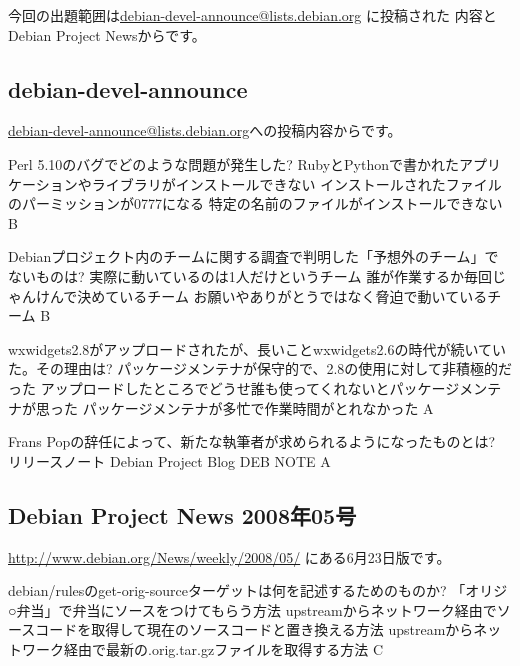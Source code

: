\documentclass[mingoth,a4paper]{jsarticle}
\begin{document}
今回の出題範囲は\url{debian-devel-announce@lists.debian.org} に投稿された
内容とDebian Project Newsからです。
\begin{multicols}{2}
 \subsection{debian-devel-announce}
 \url{debian-devel-announce@lists.debian.org}への投稿内容からです。
 
 \santaku
 {Perl 5.10のバグでどのような問題が発生した?}
 {RubyとPythonで書かれたアプリケーションやライブラリがインストールできない}
 {インストールされたファイルのパーミッションが0777になる}
 {特定の名前のファイルがインストールできない}
 {B}%
 
 \santaku
 {Debianプロジェクト内のチームに関する調査で判明した「予想外のチーム」でないものは?}%
 {実際に動いているのは1人だけというチーム}
 {誰が作業するか毎回じゃんけんで決めているチーム}
 {お願いやありがとうではなく脅迫で動いているチーム}
 {B}
 
 \santaku
 {wxwidgets2.8がアップロードされたが、長いことwxwidgets2.6の時代が続いていた。その理由は?}
 {パッケージメンテナが保守的で、2.8の使用に対して非積極的だった}
 {アップロードしたところでどうせ誰も使ってくれないとパッケージメンテナが思った}
 {パッケージメンテナが多忙で作業時間がとれなかった}
 {A}%
 
 \santaku
 {Frans Popの辞任によって、新たな執筆者が求められるようになったものとは?}
 {リリースノート}
 {Debian Project Blog}%
 {DEB NOTE}%
 {A}
 
 \subsection{Debian Project News 2008年05号}
 \url{http://www.debian.org/News/weekly/2008/05/}
 にある6月23日版です。
 
 \santaku
 {debian/rulesのget-orig-sourceターゲットは何を記述するためのものか?}
 {「オリジ○弁当」で弁当にソースをつけてもらう方法}
 {upstreamからネットワーク経由でソースコードを取得して現在のソースコードと置き換える方法}
 {upstreamからネットワーク経由で最新の.orig.tar.gzファイルを取得する方法}
 {C}%
 

\end{multicols}
\end{document}
